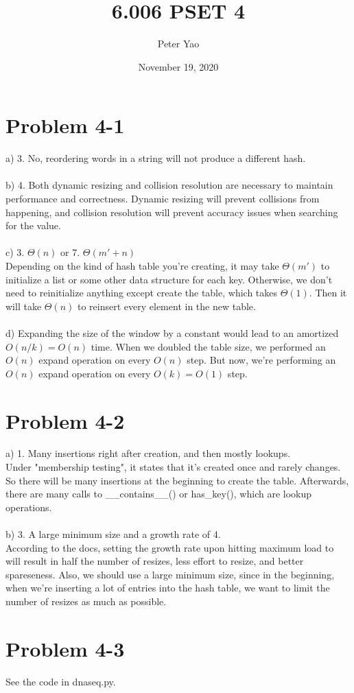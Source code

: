 \documentclass{article}
\title{6.006 PSET 4}
\author{Peter Yao}
\date{November 19, 2020}
\begin{document}
\maketitle

\section{Problem 4-1}
a) 3. No, reordering words in a string will not produce a different hash. \\\\
b) 4. Both dynamic resizing and collision resolution are necessary to maintain performance and correctness. Dynamic resizing will prevent collisions from happening, and collision resolution will prevent accuracy issues when searching for the value. \\\\
c) 3. $\Theta(n)$ or 7. $\Theta(m' + n)$ \\
Depending on the kind of hash table you're creating, it may take $\Theta(m')$ to initialize a list or some other data structure for each key. Otherwise, we don't need to reinitialize anything except create the table, which takes $\Theta(1)$. Then it will take $\Theta(n)$ to reinsert every element in the new table. \\\\
d) Expanding the size of the window by a constant would lead to an amortized $O(n/k) = O(n)$ time. When we doubled the table size, we performed an $O(n)$ expand operation on every $O(n)$ step. But now, we're performing an $O(n)$ expand operation on every $O(k) = O(1)$ step.

\section{Problem 4-2}
a) 1. Many insertions right after creation, and then mostly lookups. \\
Under "membership testing", it states that it's created once and rarely changes. So there will be many insertions at the beginning to create the table. Afterwards, there are many calls to \_\_contains\_\_() or has\_key(), which are lookup operations. \\\\
b) 3. A large minimum size and a growth rate of 4. \\
According to the docs, setting the growth rate upon hitting maximum load to  will result in half the number of resizes, less effort to resize, and better spareseness. Also, we should use a large minimum size, since in the beginning, when we're inserting a lot of entries into the hash table, we want to limit the number of resizes as much as possible.

\section{Problem 4-3}
See the code in dnaseq.py.
\end{document}
